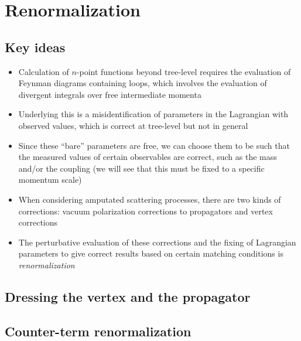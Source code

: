 \documentclass[12pt]{memoir}
\begin{document}




\mainmatter{}

\chapter{Renormalization}

\section{Key ideas}

\begin{itemize}
  \item Calculation of $n$-point functions beyond tree-level requires the evaluation of Feynman diagrams
    containing loops, which involves the evaluation of divergent integrals over free intermediate momenta
  \item Underlying this is a misidentification of parameters in the Lagrangian with observed values,
    which is correct at tree-level but not in general
  \item Since these ``bare'' parameters are free, we can choose them to be such that
    the measured values of certain observables are correct,
    such as the mass and/or the coupling (we will see that this must be fixed to a specific momentum scale)
  \item When considering amputated scattering processes, there are two kinds of corrections:
    vacuum polarization corrections to propagators and vertex corrections
  \item The perturbative evaluation of these corrections
    and the fixing of Lagrangian parameters to give correct results
    based on certain matching conditions is \textit{renormalization}
\end{itemize}

\section{Dressing the vertex and the propagator}

\section{Counter-term renormalization}
\end{document}
